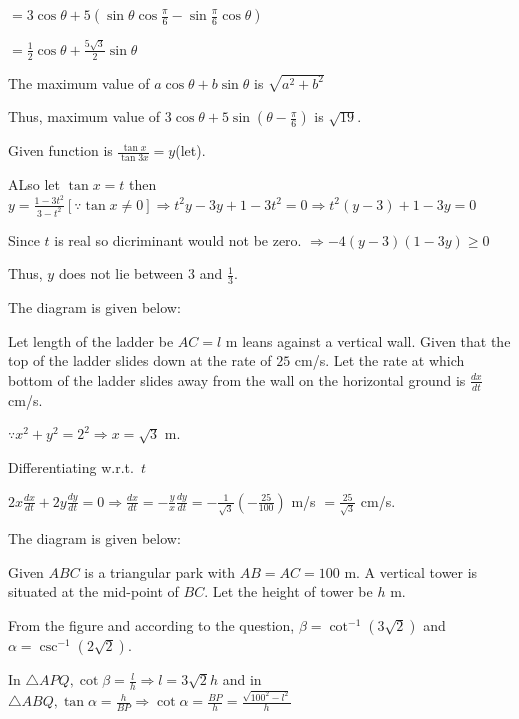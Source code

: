   $= 3\cos\theta + 5\left(\sin\theta\cos\frac{\pi}{6} - \sin\frac{\pi}{6}\cos\theta\right)$

  $= \frac{1}{2}\cos\theta + \frac{5\sqrt{3}}{2}\sin\theta$

  The maximum value of $a\cos\theta + b\sin\theta$ is $\sqrt{a^2 + b^2}$

  Thus, maximum value of $3\cos\theta + 5\sin\left(\theta - \frac{\pi}{6}\right)$ is $\sqrt{19}$.
\item Given function is $\frac{\tan x}{\tan3x} = y$(let).

  ALso let $\tan x = t$ then $y = \frac{1 - 3t^2}{3 - t^2}[\because \tan x\neq 0]\Rightarrow t^2y - 3y + 1 -
  3t^2 = 0\Rightarrow t^2(y - 3) + 1 - 3y = 0$

  Since $t$ is real so dicriminant would not be zero. $\Rightarrow -4(y - 3)(1 - 3y)\geq 0$

  Thus, $y$ does not lie between $3$ and $\frac{1}{3}$.
\item The diagram is given below:

  \startplacefigure
    \externalfigure[17_7.pdf]
  \stopplacefigure

  Let length of the ladder be $AC = l$ m leans against a vertical wall. Given that the top of the ladder
  slides down at the rate of $25$ cm/s. Let the rate at which bottom of the ladder slides away from the
  wall on the horizontal ground is $\frac{dx}{dt}$ cm/s.

  $\because x^2 + y^2 = 2^2 \Rightarrow x = \sqrt{3}$ m.

  Differentiating w.r.t.\ $t$

  $2x\frac{dx}{dt} + 2y\frac{dy}{dt} = 0 \Rightarrow \frac{dx}{dt} = -\frac{y}{x}\frac{dy}{dt} =
  -\frac{1}{\sqrt{3}}\left(-\frac{25}{100}\right)$ m/s $= \frac{25}{\sqrt{3}}$ cm/s.
\item The diagram is given below:

  \startplacefigure
    \externalfigure[17_8.pdf]
  \stopplacefigure

  Given $ABC$ is a triangular park with $AB = AC = 100$ m. A vertical tower is situated at the mid-point of
  $BC$. Let  the height of tower be $h$ m.

  From the figure and according to the question, $\beta = \cot^{-1}(3\sqrt{2})$ and $\alpha
  = \csc^{-1}(2\sqrt{2})$.

  In $\triangle APQ, \cot\beta = \frac{l}{h} \Rightarrow l = 3\sqrt{2}h$ and in $\triangle ABQ, \tan\alpha =
  \frac{h}{BP} \Rightarrow \cot\alpha = \frac{BP}{h} = \frac{\sqrt{100^2 - l^2}}{h}$

